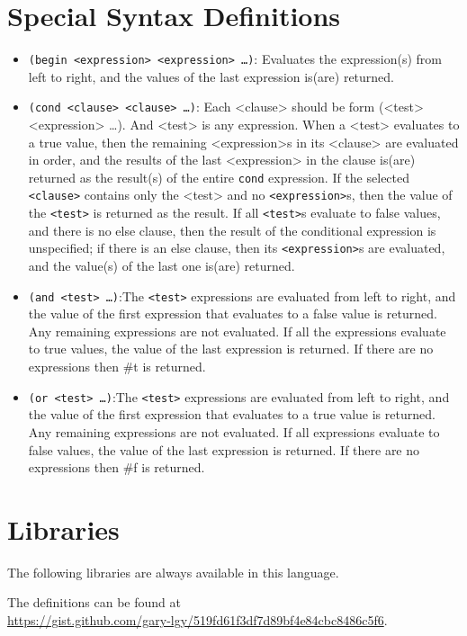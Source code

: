 \documentclass{article}
\begin{document}
\section{Special Syntax Definitions}
\begin{itemize}
\item \texttt{(begin <expression> <expression> \dots)}: Evaluates the expression(s) from left to right, and the values of the last expression is(are) returned.
\item \texttt{(cond <clause> <clause> \dots)}: Each <clause> should be form (<test> <expression> \dots). And <test> is any expression. When a <test> evaluates to a true value, then the remaining <expression>s in its <clause> are evaluated in order, and the results of the last <expression> in the clause is(are) returned as the result(s) of the entire \texttt{cond} expression. If the selected \texttt{<clause>} contains only the <test> and no \texttt{<expression>}s, then the value of the \texttt{<test>} is returned as the result. If all \texttt{<test>}s evaluate to false values, and there is no else clause, then the result of the conditional expression is unspecified; if there is an else clause, then its \texttt{<expression>}s are evaluated, and the value(s) of the last one is(are) returned.
\item \texttt{(and  <test> \dots)}:The \texttt{<test>} expressions are evaluated from left to right, and the value of the first expression that evaluates to a false value is returned. Any remaining expressions are not evaluated. If all the expressions evaluate to true values, the value of the last expression is returned. If there are no expressions then \#t is returned.
\item \texttt{(or  <test> \dots)}:The \texttt{<test>} expressions are evaluated from left to right, and the value of the first expression that evaluates to a true value is returned. Any remaining expressions are not evaluated. If all expressions evaluate to false values, the value of the last expression is returned. If there are no expressions then \#f is returned.
\end{itemize}


\section{Libraries}
The following libraries are always available in this language.

The definitions can be found at\\
\url{https://gist.github.com/gary-lgy/519fd61f3df7d89bf4e84cbc8486c5f6}.
\end{document}
